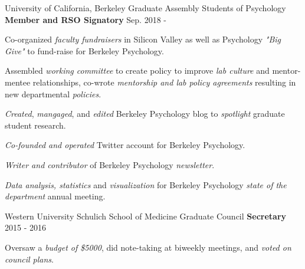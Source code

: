 

\begin{cventries}

  \cventry 
    {University of California, Berkeley} %
    {Graduate Assembly Students of Psychology}
    {\textbf{Member and RSO Signatory}} %
    {Sep. 2018 - } %
    {
      \begin{cvitems} %
        \item {Co-organized \textit{faculty fundraisers} in Silicon Valley as well as Psychology \textit{"Big Give"} to fund-raise for Berkeley Psychology.}
        \item {Assembled \textit{working committee} to create policy to improve \textit{lab culture} and mentor-mentee relationships, co-wrote \textit{mentorship and lab policy agreements} resulting in new departmental \textit{policies}.}
        \item {\textit{Created}, \textit{mangaged}, and \textit{edited} Berkeley Psychology blog to \textit{spotlight} graduate student research.}
        \item {\textit{Co-founded and operated} Twitter account for Berkeley Psychology.}
        \item {\textit{Writer and contributor} of Berkeley Psychology \textit{newsletter}.}
        \item {\textit{Data analysis, statistics} and \textit{visualization} for Berkeley Psychology \textit{state of the department} annual meeting.}
      \end{cvitems}
    }
    
  \cventry
  	{Western University} %
  	{Schulich School of Medicine Graduate Council} %
    {\textbf{Secretary}} %
    {2015 - 2016} %
    {
      \begin{cvitems} %
        \item {Oversaw a \textit{budget of \$5000}, did note-taking at biweekly meetings, and \textit{voted on council plans}.}
      \end{cvitems}
    }
    

\end{cventries}
